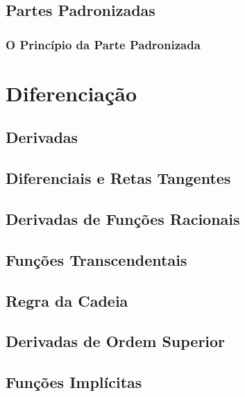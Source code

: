 \documentclass{svmono}
\begin{document}
\section{Partes Padronizadas}
\label{sec:standardparts}

\subsection{O Princípio da Parte Padronizada}
\label{sec:stpartprinciple}

\chapterproblems

\chapter{Diferenciação}
\label{chp:diff}

\section{Derivadas}
\label{sec:derivatives}

\section{Diferenciais e Retas Tangentes}
\label{sec:tglines}

\section{Derivadas de Funções Racionais}
\label{sec:derivratfunc}

\section{Funções Transcendentais}
\label{sec:transcfunc}

\section{Regra da Cadeia}
\label{sec:chainrule}

\section{Derivadas de Ordem Superior}
\label{sec:higherderivs}

\section{Funções Implícitas}
\label{sec:implicitfunc}
\end{document}
